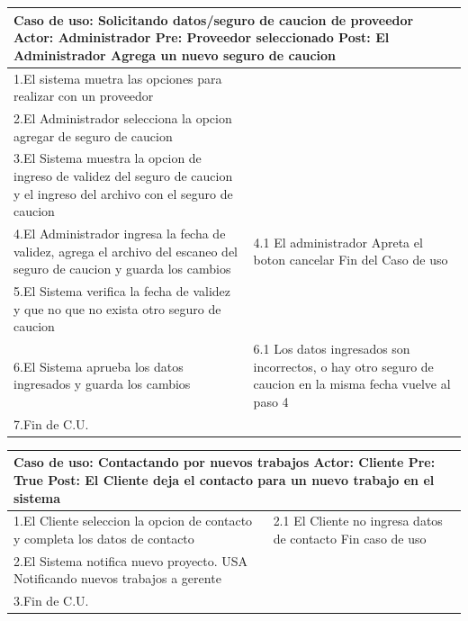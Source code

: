 \begin{longtable}{|p{}|p{}|}
    \hline
    \multicolumn{2}{|p{16cm}|}{
        \textbf{Caso de uso:} Solicitando datos/seguro de caucion de proveedor\newline
        \textbf{Actor:} Administrador\newline
        \textbf{Pre:} Proveedor seleccionado\newline
        \textbf{Post:} El Administrador Agrega un nuevo seguro de caucion
    }\\
    \hline
    1.El sistema  muetra las opciones para realizar con un proveedor & \\
    \hline
    2.El Administrador selecciona la opcion agregar de seguro de caucion& \\
    \hline
    3.El Sistema muestra la opcion de ingreso de validez del seguro de caucion y el ingreso del archivo con el seguro de caucion&  \\
    \hline
    4.El Administrador ingresa la fecha de validez, agrega el archivo del escaneo del seguro de caucion y guarda los cambios&4.1 El administrador Apreta el boton cancelar \newline 4.2 Fin del Caso de uso \\
    \hline
    5.El Sistema verifica la fecha de validez y que no que no exista otro seguro de caucion & \\
    \hline
    6.El Sistema aprueba los datos ingresados y guarda los cambios &6.1 Los datos ingresados son incorrectos, o hay otro seguro de caucion en la misma fecha  \newline 6.2 vuelve al paso 4\\
    \hline
    7.Fin de C.U.& \\
    \hline
\end{longtable}



\begin{longtable}{|p{}|p{}|}
    \hline
    \multicolumn{2}{|p{16cm}|}{
        \textbf{Caso de uso:} Contactando por nuevos trabajos\newline
        \textbf{Actor:} Cliente\newline
        \textbf{Pre: }  True\newline
        \textbf{Post:} El Cliente deja el contacto para un nuevo trabajo en el sistema
    }\\
    \hline
    1.El Cliente seleccion la opcion de contacto y completa los datos de contacto&2.1 El Cliente no ingresa datos de contacto\newline 1.2 Fin caso de uso   \\
    \hline
    2.El Sistema notifica nuevo proyecto. USA Notificando nuevos trabajos a gerente& \\
    \hline
    3.Fin de C.U.& \\
    \hline
\end{longtable}


